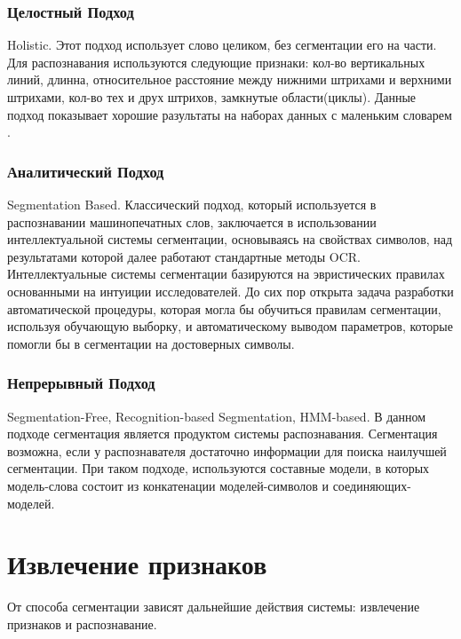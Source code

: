 \subsubsection{Целостный Подход}

Holistic. Этот подход использует слово целиком, без сегментации его на части. Для распознавания используются следующие признаки: кол-во вертикальных линий, длинна, относительное расстояние между нижними штрихами и верхними штрихами, кол-во тех и друх штрихов, замкнутые области(циклы). Данные подход показывает хорошие разультаты на наборах данных с маленьким словарем \cite{rehman2012off}.

\subsubsection{Аналитический Подход}

Segmentation Based. Классический подход, который используется в распознавании машинопечатных слов, заключается в использовании интеллектуальной системы сегментации, основываясь на свойствах символов, над результатами которой далее работают стандартные методы OCR. Интеллектуальные системы сегментации базируются на эвристических правилах основанными на интуиции исследователей. До сих пор открыта задача разработки автоматической процедуры, которая могла бы обучиться правилам сегментации, используя обучающую выборку, и автоматическому выводом параметров, которые помогли бы в сегментации на достоверных символы. \cite{bunke2003recognition}

\subsubsection{Непрерывный Подход}

Segmentation-Free, Recognition-based Segmentation, HMM-based. В данном подходе сегментация является продуктом системы распознавания. Сегментация возможна, если у распознавателя достаточно информации для поиска наилучшей сегментации. При таком подходе, используются составные модели, в которых модель-слова состоит из конкатенации моделей-символов и соединяющих-моделей. 


\section{Извлечение признаков}

От способа сегментации зависят дальнейшие действия системы: извлечение признаков и распознавание.

